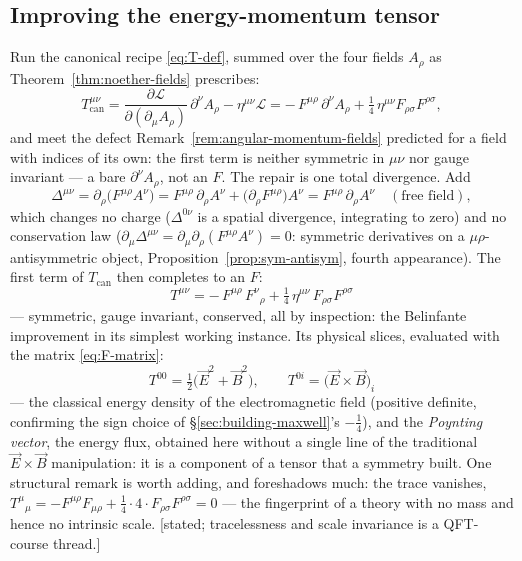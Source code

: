 \documentclass[11pt]{article}
\theoremstyle{plain}
\theoremstyle{definition}
\theoremstyle{remark}
\newcommand{\pd}[2]{\frac{\partial #1}{\partial #2}}
\newcommand{\vE}{\vec{E}}
\newcommand{\vB}{\vec{B}}
\begin{document}
\subsection{Improving the energy-momentum tensor}
\label{sec:EM-T}

Run the canonical recipe \eqref{eq:T-def}, summed over the four
fields $A_\rho$ as Theorem~\ref{thm:noether-fields} prescribes:
\begin{equation}
  T^{\mu\nu}_{\text{can}}
  = \pd{\mathcal L}{(\partial_\mu A_\rho)}\,\partial^\nu A_\rho
  - \eta^{\mu\nu}\mathcal L
  = -\,F^{\mu\rho}\,\partial^\nu A_\rho
  + \tfrac14\,\eta^{\mu\nu} F_{\rho\sigma}F^{\rho\sigma},
\end{equation}
and meet the defect Remark~\ref{rem:angular-momentum-fields}
predicted for a field with indices of its own: the first term is
neither symmetric in $\mu\nu$ nor gauge invariant --- a bare
$\partial^\nu A_\rho$, not an $F$. The repair is one total
divergence. Add
\begin{equation}
  \Delta^{\mu\nu}
  = \partial_\rho\bigl(F^{\mu\rho} A^\nu\bigr)
  = F^{\mu\rho}\,\partial_\rho A^\nu
  + \bigl(\partial_\rho F^{\mu\rho}\bigr) A^\nu
  = F^{\mu\rho}\,\partial_\rho A^\nu
  \quad(\text{free field}),
\end{equation}
which changes no charge ($\Delta^{0\nu}$ is a spatial divergence,
integrating to zero) and no conservation law
($\partial_\mu\Delta^{\mu\nu} =
\partial_\mu\partial_\rho(F^{\mu\rho}A^\nu) = 0$: symmetric
derivatives on a $\mu\rho$-antisymmetric object,
Proposition~\ref{prop:sym-antisym}, fourth appearance). The first
term of $T_{\text{can}}$ then completes to an $F$:
\begin{equation}
  \boxed{\;
  T^{\mu\nu}
  = -\,F^{\mu\rho}\,F^{\nu}{}_{\rho}
  + \tfrac14\,\eta^{\mu\nu}\, F_{\rho\sigma}F^{\rho\sigma}
  \;}
  \label{eq:EM-T}
\end{equation}
--- symmetric, gauge invariant, conserved, all by inspection: the
Belinfante improvement in its simplest working instance. Its
physical slices, evaluated with the matrix \eqref{eq:F-matrix}:
\begin{equation}
  \boxed{\;
  T^{00} = \tfrac12\bigl(\vE^2 + \vB^2\bigr),
  \qquad
  T^{0i} = \bigl(\vE\times\vB\bigr)_i
  \;}
  \label{eq:poynting}
\end{equation}
--- the classical energy density of the electromagnetic field
(positive definite, confirming the sign choice of
\S\ref{sec:building-maxwell}'s $-\tfrac14$), and the
\emph{Poynting vector}, the energy flux, obtained here without a
single line of the traditional $\vE\times\vB$ manipulation: it is a
component of a tensor that a symmetry built. One structural remark
is worth adding, and foreshadows much: the trace vanishes,
$T^\mu{}_\mu = -F^{\mu\rho}F_{\mu\rho} + \tfrac14\cdot 4\cdot
F_{\rho\sigma}F^{\rho\sigma} = 0$ --- the fingerprint of a theory
with no mass and hence no intrinsic scale. [stated; tracelessness
and scale invariance is a QFT-course thread.]
\end{document}
